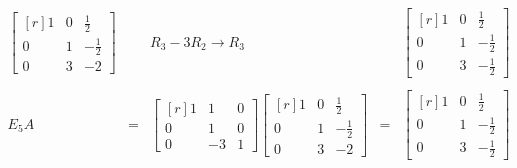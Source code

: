\begin{enumerate}
    $$\begin{array}{rcccc}
	\begin{bmatrix*}[r]
	    1 & 0 & \frac{1}{2}\\
	    0 & 1 & -\frac{1}{2}\\
	    0 & 3 & -2
	\end{bmatrix*} && R_3-3R_2\to R_3 & &
	\begin{bmatrix*}[r]
	    1 & 0 & \frac{1}{2}\\
	    0 & 1 & -\frac{1}{2}\\
	    0 & 3 & -\frac{1}{2}
	\end{bmatrix*} \\\\
	E_5A&=&\begin{bmatrix*}[r]
	    1 & 1 & 0\\
	    0 & 1 & 0\\
	    0 & -3 & 1
	\end{bmatrix*} 
	\begin{bmatrix*}[r]
	    1 & 0 & \frac{1}{2}\\
	    0 & 1 & -\frac{1}{2}\\
	    0 & 3 & -2
	\end{bmatrix*} &=& 
	\begin{bmatrix*}[r]
	    1 & 0 & \frac{1}{2}\\
	    0 & 1 & -\frac{1}{2}\\
	    0 & 3 & -\frac{1}{2}
	\end{bmatrix*} \\\\
    \end{array}$$


\end{enumerate}
